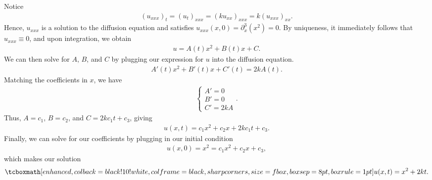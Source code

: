 
Notice 
\begin{eqnarray}
    \label{eq:derivative-heat-eq}
    (u_{xxx})_{t} = (u_{t})_{xxx} = (ku_{xx})_{xxx} = k(u_{xxx})_{xx}
.\end{eqnarray}
Hence, $u_{xxx}$ is a solution to the diffusion equation and satisfies $u_{xxx}(x,0) = \partial_{x}^{3}(x^2) = 0$.
By uniqueness, it immediately follows that $u_{xxx} \equiv 0$, and upon integration, we obtain
\begin{eqnarray}
    \label{eq:uxxx-int}
    u = A(t)x^2 + B(t)x + C
.\end{eqnarray}
We can then solve for $A$, $B$, and $C$ by plugging our expression for $u$ into the diffusion equation.
\begin{eqnarray}
    \label{eq:solve-ABC}
    A'(t)x^2 + B'(t)x + C'(t) = 2kA(t)
.\end{eqnarray}
Matching the coefficients in $x$, we have
\begin{eqnarray}
    \label{eq:eq-ABC}
    \begin{cases}
    A' = 0 \\
    B' = 0 \\
    C' = 2kA
    \end{cases} 
.\end{eqnarray}
Thus, $A = c_{1}$, $B = c_{2}$, and $C = 2kc_{1}t + c_{3}$, giving
\begin{eqnarray}
    \label{eq:u_xt}
    u(x,t) = c_{1}x^2 + c_{2}x + 2kc_{1}t + c_{3}
.\end{eqnarray}
Finally, we can solve for our coefficients by plugging in our initial condition 
\begin{eqnarray}
    \label{eq:solve-coeff}
    u(x,0) = x^2 = c_{1}x^2 + c_{2}x + c_{3} 
,\end{eqnarray}
which makes our solution
\begin{eqnarray}
    \label{eq:u_xt-sol}
    \eqbox{
    u(x,t) = x^2 + 2kt
}
.\end{eqnarray}



